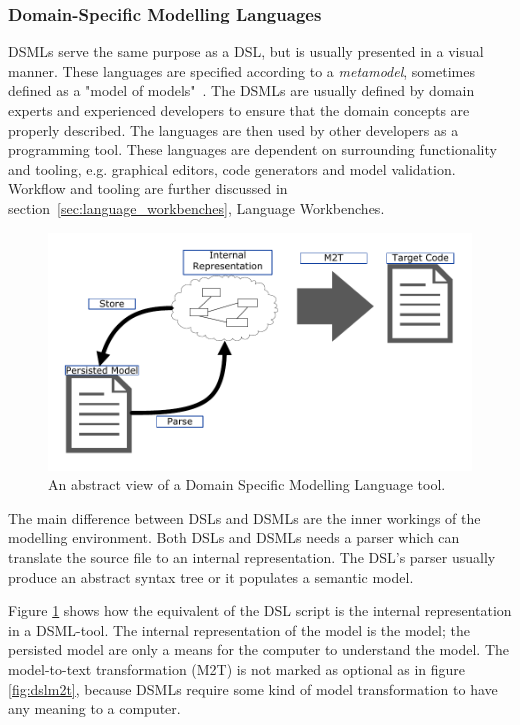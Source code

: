 \subsubsection{Domain-Specific Modelling Languages} 
DSMLs serve the same purpose as a DSL, but is usually presented in a visual manner. These languages are specified according to a \emph{metamodel}, sometimes defined as a "model of models"~\cite{rutle_thesis_2010}. The DSMLs are usually defined by domain experts and experienced developers to ensure that the domain concepts are properly described. The languages are then used by other developers as a programming tool. These languages are dependent on surrounding functionality and tooling, e.g. graphical editors, code generators and model validation. Workflow and tooling are further discussed in section~\ref{sec:language_workbenches}, Language Workbenches. 
\begin{figure}[htpb]
    \centering
    \centerline{\includegraphics[scale=0.7]{images/dsml2.pdf}}
    \caption[Domain Specific Modelling Language tool]{An abstract view of a Domain Specific Modelling Language tool.}
    \label{fig:dsml2}
\end{figure}

The main difference between DSLs and DSMLs are the inner workings of the modelling environment. Both DSLs and DSMLs needs a parser which can translate the source file to an internal representation. The DSL's parser usually produce an abstract syntax tree or it populates a semantic model. 

Figure \ref{fig:dsml2} shows how the equivalent of the DSL script is the internal representation in a DSML-tool. The internal representation of the model is the model; the persisted model are only a means for the computer to understand the model. The model-to-text transformation (M2T) is not marked as optional as in figure \ref{fig:dslm2t}, because DSMLs require some kind of model transformation to have any meaning to a computer. 


